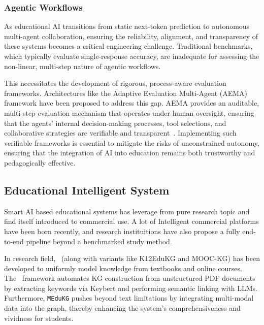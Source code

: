 \subsubsection*{Agentic Workflows}
As educational AI transitions from static next-token prediction to autonomous multi-agent collaboration, ensuring the reliability, alignment, and transparency of 
these systems becomes a critical engineering challenge. Traditional benchmarks, which typically evaluate single-response accuracy, are inadequate for assessing the 
non-linear, multi-step nature of agentic workflows. 

This necessitates the development of rigorous, process-aware evaluation frameworks. Architectures like the Adaptive Evaluation Multi-Agent (AEMA) framework have been 
proposed to address this gap. AEMA provides an auditable, multi-step evaluation mechanism that operates under human oversight, ensuring that the agents' internal 
decision-making processes, tool selections, and collaborative strategies are verifiable and transparent~\cite{AEMA_agentic_eval}. Implementing such verifiable 
frameworks is essential to mitigate the risks of unconstrained autonomy, ensuring that the integration of AI into education remains both trustworthy and pedagogically effective.

\subsection{Educational Intelligent System}
Smart AI based educational systems has leverage from pure research topic and find itself introduced to commercial use. A lot of Intelligent commercial platforms have been 
born recently, and research instituitions have also propose a fully end-to-end pipeline beyond a benchmarked study method. 

In research field,~\cite{EduKG} (along with variants like K12EduKG and MOOC-KG) has been developed to uniformly model knowledge from textbooks and online courses. The~\cite{EduKGPipe} framework automates KG construction from unstructured PDF documents by extracting keywords via Keybert and performing semantic linking with LLMs. 
Furthermore, \texttt{MEduKG} pushes beyond text limitations by integrating multi-modal data into the graph, thereby enhancing the system's comprehensiveness and 
vividness for students.

